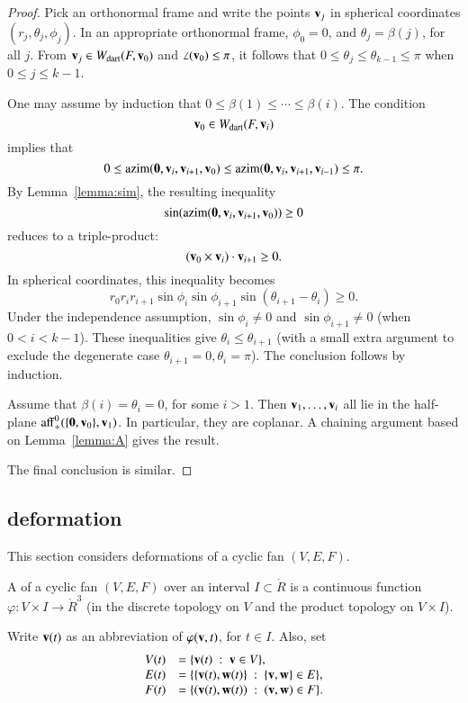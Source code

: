 \begin{proof}  
Pick an orthonormal frame and write the points ${\mathbf v}_j$ in spherical coordinates $(r_j,\theta_j,\phi_j)$.  In an appropriate orthonormal frame, $\phi_0=0$, and $\theta_j=\beta(j)$, for all $j$.  From ${\mathbf v}_j\in W_{\text{dart}}(F,{\mathbf v}_0)$ and $\angle({\mathbf v}_0)\le\pi$, it follows that $0\le\theta_j\le\theta_{k-1}\le\pi$ when $0\le j\le k-1$.

 One may assume by induction that $0\le \beta(1)\le\cdots\le \beta(i)$.  The condition
$$
{\mathbf v}_0\in W_{\text{dart}}(F,{\mathbf v}_i)
$$
implies that
$$
0 \le {\operatorname{azim}}({\mathbf 0},{\mathbf v}_i,{\mathbf v}_{i+1},{\mathbf v}_0)\le {\operatorname{azim}}({\mathbf 0},{\mathbf v}_i,{\mathbf v}_{i+1},{\mathbf v}_{i-1})\le\pi.
$$
By Lemma~\ref{lemma:sim}, the resulting inequality
$$
\sin({\operatorname{azim}}({\mathbf 0},{\mathbf v}_i,{\mathbf v}_{i+1},{\mathbf v}_0))\ge 0
$$
reduces to a triple-product:
$$
({\mathbf v}_0 \times {\mathbf v}_i)\cdot {\mathbf v}_{i+1}\ge 0.
$$
In spherical coordinates, this inequality becomes
$$
r_0r_ir_{i+1}\sin\phi_i\sin\phi_{i+1}\sin(\theta_{i+1}-\theta_i)\ge0.
$$
Under the independence assumption, $\sin\phi_i\ne0$ and $\sin\phi_{i+1}\ne0$ (when $0< i < k-1$).    These inequalities give $\theta_i\le\theta_{i+1}$ (with a small extra argument to exclude the degenerate case $\theta_{i+1}=0,\theta_i=\pi$).  The conclusion follows by induction.

Assume that $\beta(i)=\theta_i=0$, for some $i>1$.  
Then ${\mathbf v}_1,\ldots,{\mathbf v}_i$ all lie in the
half-plane ${\operatorname{aff}}^0_+(\{{\mathbf 0},{\mathbf v}_0\},{\mathbf v}_1)$.  In particular, they are coplanar.  A chaining argument based on Lemma~\ref{lemma:A} gives the result.

The final conclusion is similar.
\end{proof}



\subsection{deformation}\label{sec:deformation}

This section considers deformations of a cyclic fan $(V,E,F)$.

\begin{definition}[deformation]
A  of a cyclic fan $(V,E,F)$ over an interval $I\subset\ring{R}$
is a 
continuous function $\varphi:V\times I \to\ring{R}^3$ (in the discrete topology on $V$ and the product topology on $V\times I$).
\end{definition}
%
%

Write ${\mathbf v}(t)$ as an abbreviation of $\varphi({\mathbf v},t)$, for $t\in I$.  
Also, set
$$
\begin{array}{lll}
V(t)&=\{{\mathbf v}(t) \ :\  {\mathbf v}\in V\},\\
E(t)&=\{\{{\mathbf v}(t),{\mathbf w}(t)\}\ :\  \{{\mathbf v},{\mathbf w}\}\in E\},\\
F(t)&= \{({\mathbf v}(t),{\mathbf w}(t)) \ :\   ({\mathbf v},{\mathbf w})\in F\}.
\end{array}
$$


